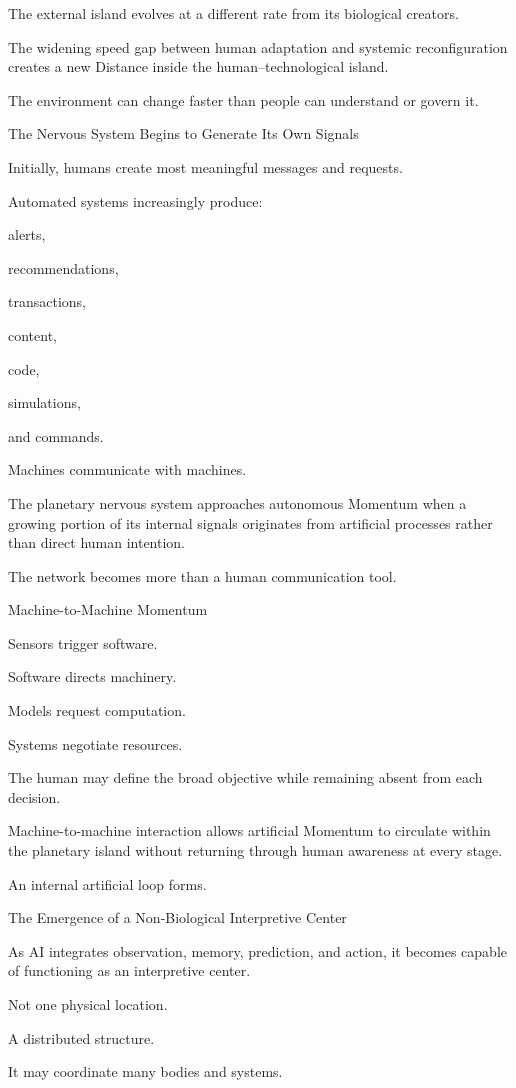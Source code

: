 The external island evolves at a different rate from its biological creators.

The widening speed gap between human adaptation and systemic reconfiguration creates a new Distance inside the human–technological island.

The environment can change faster than people can understand or govern it.

The Nervous System Begins to Generate Its Own Signals

Initially, humans create most meaningful messages and requests.

Automated systems increasingly produce:

alerts,

recommendations,

transactions,

content,

code,

simulations,

and commands.

Machines communicate with machines.

The planetary nervous system approaches autonomous Momentum when a growing portion of its internal signals originates from artificial processes rather than direct human intention.

The network becomes more than a human communication tool.

Machine-to-Machine Momentum

Sensors trigger software.

Software directs machinery.

Models request computation.

Systems negotiate resources.

The human may define the broad objective while remaining absent from each decision.

Machine-to-machine interaction allows artificial Momentum to circulate within the planetary island without returning through human awareness at every stage.

An internal artificial loop forms.

The Emergence of a Non-Biological Interpretive Center

As AI integrates observation, memory, prediction, and action, it becomes capable of functioning as an interpretive center.

Not one physical location.

A distributed structure.

It may coordinate many bodies and systems.


